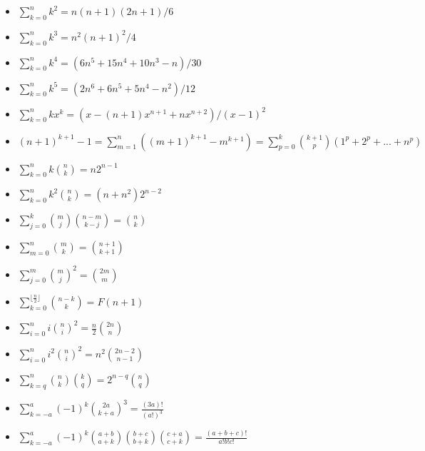 \usepackage{mathtools}

\begin{itemize}
    \item $\sum_{k=0}^{n} k^2 = n(n+1)(2n+1)/6$
    \item $\sum_{k=0}^{n} k^3 = n^2(n+1)^2/4$
    \item $\sum_{k=0}^{n} k^4 = (6n^5+15n^4+10n^3-n)/30$
    \item $\sum_{k=0}^{n} k^5 = (2n^6+6n^5+5n^4-n^2)/12$
    \item $\sum_{k=0}^{n} kx^{k} = (x - (n+1)x^{n+1} + nx^{n+2}) / (x-1)^2$
    \item $(n+1)^{k+1} - 1 = \sum_{m=1}^{n} ((m+1)^{k+1} - m^{k+1}) = \sum_{p=0}^{k} \binom{k+1}{p}(1^p + 2^p + ... + n^p)$
    \item $\sum_{k=0}^{n} k \binom{n}{k} = n2^{n-1}$
    \item $\sum_{k=0}^{n} k^2 \binom{n}{k} = (n + n^2)2^{n-2}$
    \item $\sum_{j=0}^{k} \binom{m}{j} \binom{n-m}{k-j} = \binom{n}{k}$
    \item $\sum_{m=0}^{n} \binom{m}{k} = \binom{n+1}{k+1}$
    \item $\sum_{j=0}^{m} \binom{m}{j}^2 = \binom{2m}{m}$
    \item $\sum_{k=0}^{\lfloor\frac{n}{2}\rfloor} \binom{n-k}{k} = F(n+1)$
    \item $\sum_{i=0}^{n} i \binom{n}{i}^2 = \frac{n}{2} \binom{2n}{n}$
    \item $\sum_{i=0}^{n} i^2 \binom{n}{i}^2 = n^2 \binom{2n-2}{n-1}$
    \item $\sum_{k=q}^{n} \binom{n}{k}\binom{k}{q} = 2^{n-q}\binom{n}{q}$
    \item $\sum_{k=-a}^{a} (-1)^k \binom{2a}{k+a}^3 = \frac{(3a)!}{(a!)^3}$
    \item $\sum_{k=-a}^{a} (-1)^k \binom{a+b}{a+k}\binom{b+c}{b+k}\binom{c+a}{c+k} = \frac{(a+b+c)!}{a!b!c!}$
\end{itemize}